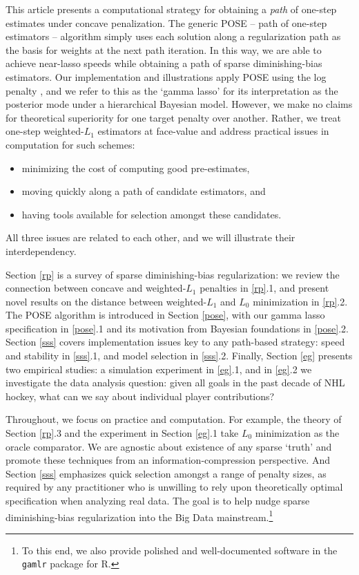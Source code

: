 \documentclass[12pt]{article}
\begin{document}
This article presents a computational strategy for obtaining a {\it path} of
 one-step estimates under concave penalization.  The generic POSE -- path of
 one-step estimators -- algorithm simply uses each solution along a
 regularization path as the basis for weights at the next path iteration. In
 this way, we are able to achieve  near-lasso speeds while obtaining a path of
 sparse diminishing-bias estimators.  Our implementation and illustrations
 apply POSE using the log penalty
 \citep[e.g.][]{candes_enhancing_2008}, and we refer to this as the `gamma
 lasso'  for its interpretation as the posterior mode under a hierarchical Bayesian model.
However, we make no claims for theoretical superiority for one target penalty over another.  Rather, we treat one-step weighted-$L_1$ estimators at face-value and address practical issues in computation for such schemes:
\begin{itemize}
\item minimizing the cost of computing good pre-estimates,
\item moving quickly along a path of candidate estimators, and
\item having tools available for selection amongst these candidates.
\end{itemize}
All three issues are related to each other, and we will illustrate their interdependency.

Section \ref{rp} is a survey of sparse diminishing-bias
regularization: we
review the connection between concave and weighted-$L_1$ penalties in
\ref{rp}.1, and present novel results on the distance between weighted-$L_1$
 and $L_0$ minimization in \ref{rp}.2. The POSE algorithm is introduced in
Section \ref{pose}, with our  gamma lasso specification in \ref{pose}.1 and its motivation from Bayesian foundations in \ref{pose}.2.  Section \ref{sss}  covers
implementation issues key to any path-based strategy:  speed and stability
in \ref{sss}.1, and model selection  in \ref{sss}.2.  Finally, Section
\ref{eg} presents two empirical studies:
a  simulation experiment in \ref{eg}.1, and in \ref{eg}.2 we investigate the data analysis question: given all goals in the past decade of NHL hockey, what can we say about individual player contributions? 

Throughout,
we focus on practice and computation.  For example, the theory of Section
\ref{rp}.3 and the experiment in Section \ref{eg}.1 take $L_0$
minimization as the oracle comparator. We are agnostic about existence of
any sparse `truth' and promote these techniques from an
 information-compression perspective. And Section \ref{sss} emphasizes
quick selection amongst a range of penalty sizes, as required
by any practitioner who is unwilling to rely upon theoretically
optimal specification when analyzing real data. The goal is to help nudge
sparse diminishing-bias regularization into the Big Data
mainstream.\footnote{To this end, we also provide polished and well-documented
software in the
\texttt{gamlr} package for R.}
\end{document}
